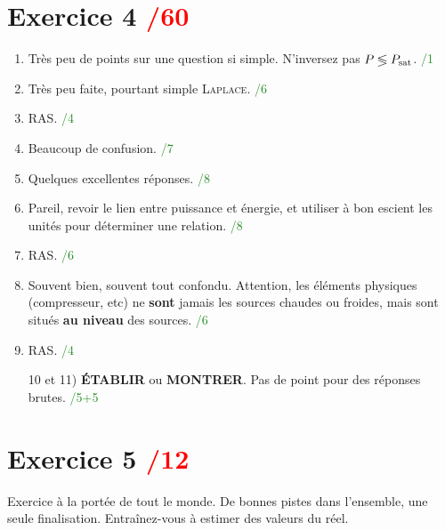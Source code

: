 \documentclass[a4paper, 11pt, final, garamond]{book}
\begin{document}
\section{Exercice 4 \hfill \textcolor{red}{/60}}
\begin{enumerate}
  \item Très peu de points sur une question si simple. N'inversez pas $P
    \lessgtr P_{\rm sat}$.
    \hfill \textcolor{ForestGreen}{/1}
  \item Très peu faite, pourtant simple \textsc{Laplace}.
    \hfill \textcolor{ForestGreen}{/6}
  \item RAS.
    \hfill \textcolor{ForestGreen}{/4}
  \item Beaucoup de confusion.
    \hfill \textcolor{ForestGreen}{/7}
  \item Quelques excellentes réponses.
    \hfill \textcolor{ForestGreen}{/8}
  \item Pareil, revoir le lien entre puissance et énergie, et utiliser à bon
    escient les unités pour déterminer une relation.
    \hfill \textcolor{ForestGreen}{/8}
  \item RAS.
    \hfill \textcolor{ForestGreen}{/6}
  \item Souvent bien, souvent tout confondu. Attention, les éléments physiques
    (compresseur, etc) ne \textbf{sont} jamais les sources chaudes ou froides,
    mais sont situés \textbf{au niveau} des sources.
    \hfill \textcolor{ForestGreen}{/6}
  \item RAS.
    \hfill \textcolor{ForestGreen}{/4}
  \item[10 et 11)] \textbf{ÉTABLIR} ou \textbf{MONTRER}. Pas de point pour des
    réponses brutes.
    \hfill \textcolor{ForestGreen}{/5+5}
\end{enumerate}

\section{Exercice 5 \hfill \textcolor{red}{/12}}
Exercice à la portée de tout le monde. De bonnes pistes dans l'ensemble, une
seule finalisation. Entraînez-vous à estimer des valeurs du réel.
\end{document}
